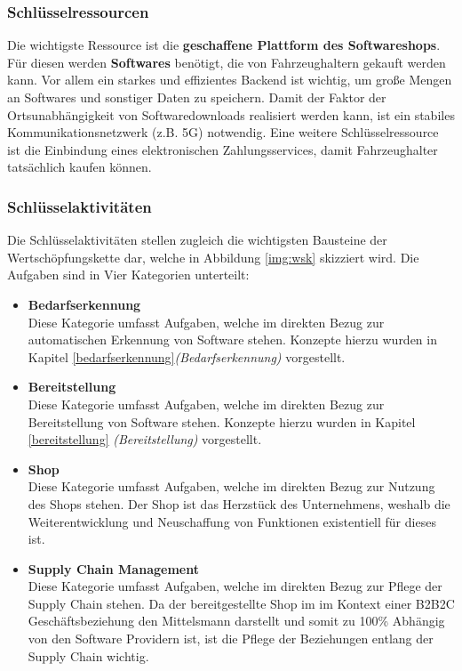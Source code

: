 \subsubsection{Schlüsselressourcen}
Die wichtigste Ressource ist die \textbf{geschaffene Plattform des Softwareshops}. Für diesen werden \textbf{Softwares} benötigt, die von Fahrzeughaltern gekauft werden kann. Vor allem ein starkes und effizientes Backend ist wichtig, um große Mengen an Softwares und sonstiger Daten zu speichern. Damit der Faktor der Ortsunabhängigkeit von Softwaredownloads realisiert werden kann, ist ein stabiles Kommunikationsnetzwerk (z.B. 5G) notwendig. Eine weitere Schlüsselressource ist die Einbindung eines elektronischen Zahlungsservices, damit Fahrzeughalter tatsächlich kaufen können.

\subsubsection{Schlüsselaktivitäten}\label{key_activities}
Die Schlüsselaktivitäten stellen zugleich die wichtigsten Bausteine der Wertschöpfungskette dar, welche in Abbildung \ref{img:wsk} skizziert wird. Die Aufgaben sind in Vier Kategorien unterteilt:
\begin{itemize}
	\item \textbf{Bedarfserkennung}\\
	Diese Kategorie umfasst Aufgaben, welche im direkten Bezug zur automatischen Erkennung von Software stehen. Konzepte hierzu wurden in Kapitel \ref{bedarfserkennung}\textit{(Bedarfserkennung)} vorgestellt.
	
	\item \textbf{Bereitstellung}\\
	Diese Kategorie umfasst Aufgaben, welche im direkten Bezug zur Bereitstellung von Software stehen. Konzepte hierzu wurden in Kapitel \ref{bereitstellung} \textit{(Bereitstellung)} vorgestellt.
	
	\item \textbf{Shop}\\
	Diese Kategorie umfasst Aufgaben, welche im direkten Bezug zur Nutzung des Shops stehen. Der Shop ist das Herzstück des Unternehmens, weshalb die Weiterentwicklung und Neuschaffung von Funktionen existentiell für dieses ist.
	
	\item \textbf{Supply Chain Management}\\
	Diese Kategorie umfasst Aufgaben, welche im direkten Bezug zur Pflege der Supply Chain stehen. Da der bereitgestellte Shop im im Kontext einer B2B2C Geschäftsbeziehung den Mittelsmann darstellt und somit zu 100\% Abhängig von den Software Providern ist, ist die Pflege der Beziehungen entlang der Supply Chain wichtig. 
\end{itemize}
